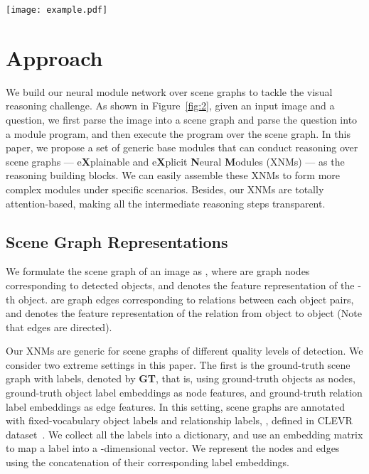 \documentclass[10pt,twocolumn,letterpaper]{article}
\begin{document}
\begin{figure*}[ht]
\texttt{[image: example.pdf]}
\caption{To answer a question about an image, we need to 1) parse the image into a scene graph, 2) parse the question into a module program, and 3) reasoning over the scene graph. Here, we show the reasoning details of an example from CLEVR. The nodes and edges in red are attended. \texttt{Scene} is a dummy placeholder module that attends all nodes. All intermediate steps of our XNMs are explainable and explicit.}
\label{fig:2}
\vspace{-0.4cm}
\end{figure*}







\vspace{-0.2cm}
\section{Approach}
We build our neural module network over scene graphs to tackle the visual reasoning challenge.
As shown in Figure~\ref{fig:2}, given an input image and a question, we first parse the image into a scene graph and parse the question into a module program, and then execute the program over the scene graph. In this paper, we propose a set of generic base modules that can conduct reasoning over scene graphs --- e\textbf{X}plainable and e\textbf{X}plicit \textbf{N}eural \textbf{M}odules (XNMs) --- as the reasoning building blocks. We can easily assemble these XNMs to form more complex modules under specific scenarios. Besides, our XNMs are totally attention-based, making all the intermediate reasoning steps transparent.

\vspace{-0.1cm}
\subsection{Scene Graph Representations}
\vspace{-0.1cm}
We formulate the scene graph of an image as , where  are graph nodes corresponding to  detected objects, and  denotes the feature representation of the -th object.
 are graph edges corresponding to relations between each object pairs, and  denotes the feature representation of the relation from object  to object  (Note that edges are directed).

Our XNMs are generic for scene graphs of different quality levels of detection.
We consider two extreme settings in this paper.
The first is the ground-truth scene graph with labels, denoted by \textbf{GT}, that is, using ground-truth objects as nodes, ground-truth object label embeddings as node features, and ground-truth relation label embeddings as edge features.
In this setting, scene graphs are annotated with fixed-vocabulary object labels and relationship labels, \eg, defined in CLEVR dataset~\cite{johnson2017clevr}.
We collect all the  labels into a dictionary, and use an embedding matrix  to map a label into a -dimensional vector.
We represent the nodes and edges using the concatenation of their corresponding label embeddings.
\end{document}
